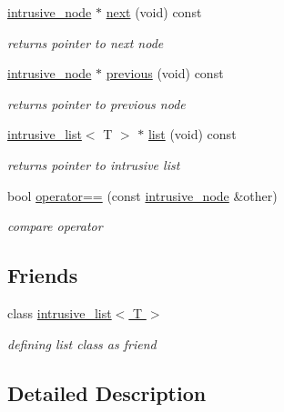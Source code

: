 \begin{DoxyCompactItemize}
\hyperlink{classcrap_1_1intrusive__node}{intrusive\+\_\+node} $\ast$ \hyperlink{classcrap_1_1intrusive__node_a284c8a3480e6e5195633b01d90abf85d}{next} (void) const 
\begin{DoxyCompactList}\small\item\em returns pointer to next node \end{DoxyCompactList}\item 
\hyperlink{classcrap_1_1intrusive__node}{intrusive\+\_\+node} $\ast$ \hyperlink{classcrap_1_1intrusive__node_a366a5d51e32c3d204d229dd36785495b}{previous} (void) const 
\begin{DoxyCompactList}\small\item\em returns pointer to previous node \end{DoxyCompactList}\item 
\hyperlink{singletoncrap_1_1intrusive__list}{intrusive\+\_\+list}$<$ T $>$ $\ast$ \hyperlink{classcrap_1_1intrusive__node_abfef045836dcfefba5c5189267d0cedd}{list} (void) const 
\begin{DoxyCompactList}\small\item\em returns pointer to intrusive list \end{DoxyCompactList}\item 
bool \hyperlink{classcrap_1_1intrusive__node_a03a03db2b8ce66d8f3a609ac432bcb87}{operator==} (const \hyperlink{classcrap_1_1intrusive__node}{intrusive\+\_\+node} \&other)
\begin{DoxyCompactList}\small\item\em compare operator \end{DoxyCompactList}\end{DoxyCompactItemize}
\subsection*{Friends}
\begin{DoxyCompactItemize}
\item 
class \hyperlink{classcrap_1_1intrusive__node_a8abfe7a49da2ca301723ee176edb482f}{intrusive\+\_\+list$<$ T $>$}
\begin{DoxyCompactList}\small\item\em defining list class as friend \end{DoxyCompactList}\end{DoxyCompactItemize}


\subsection{Detailed Description}
